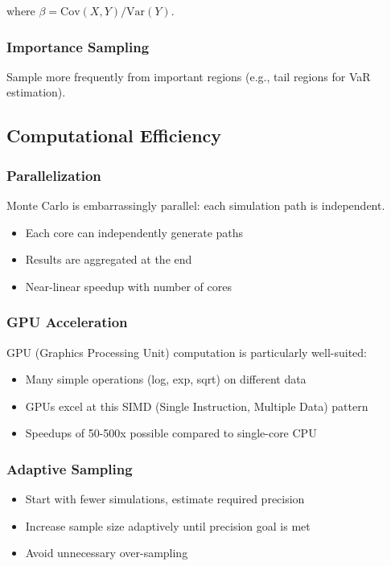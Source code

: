 \documentclass[12pt,a4paper]{article}
\begin{document}
where $\beta = \text{Cov}(X, Y) / \text{Var}(Y)$.

\subsubsection{Importance Sampling}

Sample more frequently from important regions (e.g., tail regions for VaR estimation).

\subsection{Computational Efficiency}

\subsubsection{Parallelization}

Monte Carlo is embarrassingly parallel: each simulation path is independent. 
\begin{itemize}
    \item Each core can independently generate paths
    \item Results are aggregated at the end
    \item Near-linear speedup with number of cores
\end{itemize}

\subsubsection{GPU Acceleration}

GPU (Graphics Processing Unit) computation is particularly well-suited:
\begin{itemize}
    \item Many simple operations (log, exp, sqrt) on different data
    \item GPUs excel at this SIMD (Single Instruction, Multiple Data) pattern
    \item Speedups of 50-500x possible compared to single-core CPU
\end{itemize}

\subsubsection{Adaptive Sampling}

\begin{itemize}
    \item Start with fewer simulations, estimate required precision
    \item Increase sample size adaptively until precision goal is met
    \item Avoid unnecessary over-sampling
\end{itemize}
\end{document}
